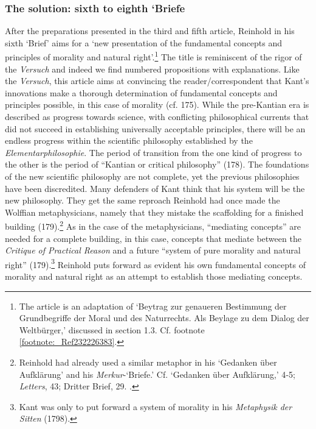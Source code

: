 \subsubsection{The solution: sixth to eighth `Briefe}


After the preparations presented in the third and fifth article, Reinhold in his sixth `Brief' aims for a `new presentation of the fundamental concepts and principles of morality and natural right'.\footnote{ The article is an adaptation of `Beytrag zur genaueren Bestimmung der Grundbegriffe der Moral und des Naturrechts. Als Beylage zu dem Dialog der Weltb\"{u}rger,' discussed in section 1.3. Cf. footnote \ref{footnote:_Ref232226383}. } The title is reminiscent of the rigor of the \textit{Versuch} and indeed we find numbered propositions with explanations. Like the \textit{Versuch}, this article aims at convincing the reader/correspondent that Kant's innovations make a thorough determination of fundamental concepts and principles possible, in this case of morality (cf. 175). While the pre{-}Kantian era is described as progress towards science, with conflicting philosophical currents that did not succeed in establishing universally acceptable principles, there will be an endless progress within the scientific philosophy established by the \textit{Elementarphilosophie}. The period of transition from the one kind of progress to the other is the period of ``Kantian or critical philosophy'' (178). The foundations of the new scientific philosophy are not complete, yet the previous philosophies have been discredited. Many defenders of Kant think that his system will be the new philosophy. They get the same reproach Reinhold had once made the Wolffian metaphysicians, namely that they mistake the scaffolding for a finished building (179).\footnote{ Reinhold had already used a similar metaphor in his `Gedanken \"{u}ber Aufkl\"{a}rung' and his \textit{Merkur}{-}`Briefe.' Cf. `Gedanken \"{u}ber Aufkl\"{a}rung,' 4{-}5; \textit{Letters}, 43; Dritter Brief, 29. .} As in the case of the metaphysicians, ``mediating concepts'' are needed for a complete building, in this case, concepts that mediate between the \textit{Critique of Practical Reason} and a future ``system of pure morality and natural right'' (179).\footnote{ Kant was only to put forward a system of morality in his \textit{Metaphysik der Sitten} (1798).} Reinhold puts forward as evident his own fundamental concepts of morality and natural right as an attempt to establish those mediating concepts. 

